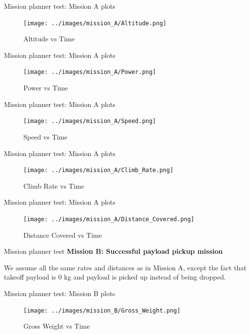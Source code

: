 \documentclass{beamer}
\begin{document}
\begin{frame}{Mission planner test: Mission A plots}
  \begin{figure}
    \centering
    \texttt{[image: ../images/mission\_A/Altitude.png]}
    \caption{Altitude vs Time}
  \end{figure}

\end{frame}

\begin{frame}{Mission planner test: Mission A plots}
  \begin{figure}
    \centering
    \texttt{[image: ../images/mission\_A/Power.png]}
    \caption{Power vs Time}
  \end{figure}
\end{frame}

\begin{frame}{Mission planner test: Mission A plots}
  \begin{figure}
    \centering
    \texttt{[image: ../images/mission\_A/Speed.png]}
    \caption{Speed vs Time}
  \end{figure}
\end{frame}

\begin{frame}{Mission planner test: Mission A plots}
  \begin{figure}
    \centering
    \texttt{[image: ../images/mission\_A/Climb\_Rate.png]}
    \caption{Climb Rate vs Time}
  \end{figure}
\end{frame}

\begin{frame}{Mission planner test: Mission A plots}
  \begin{figure}
    \centering
    \texttt{[image: ../images/mission\_A/Distance\_Covered.png]}
    \caption{Distance Covered vs Time}
  \end{figure}
\end{frame}


\begin{frame}{Mission planner test}
  \textbf{Mission B: Successful payload pickup mission}

  We assume all the same rates and distances as in Mission A, except the fact that takeoff payload is $0$ kg and payload is picked up instead of being dropped.

\end{frame}

\begin{frame}{Mission planner test: Mission B plots}
  \begin{figure}
    \centering
    \texttt{[image: ../images/mission\_B/Gross\_Weight.png]}
    \caption{Gross Weight vs Time}
  \end{figure}
\end{frame}
\end{document}
